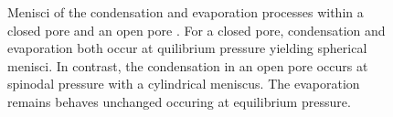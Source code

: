 \documentclass[../../thesis.tex]{subfiles}
\begin{document}
\begin{figure}[htb]
{
              \label{fig:open-pore-process}
            }
    \caption{Menisci of the condensation and evaporation processes within a closed pore \protect{} and an open pore \protect{}. For a closed pore, condensation and evaporation both occur at quilibrium pressure yielding spherical menisci. In contrast, the condensation in an open pore occurs at spinodal pressure with a cylindrical meniscus. The evaporation remains behaves unchanged occuring at equilibrium pressure.}
    \label{fig:pore-cond-evap-model}
\end{figure}
\end{document}
